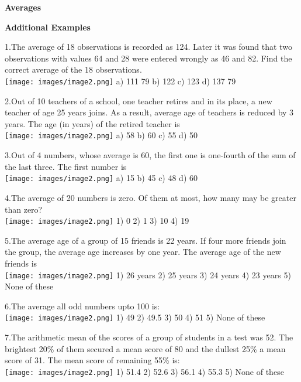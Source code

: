 \documentclass[
]{article}
\author{}
\date{}
\begin{document}
\begin{center}
	{\Large \textbf{Averages \\}}
\end{center}

{\large \textbf{Additional Examples \\}}

 1.The average of 18 observations is recorded as 124. Later it was found that two observations with values 64 and 28 were entered wrongly as 46 and 82. Find the correct average of the 18 observations.  \\
\texttt{[image: images/image2.png]}  a) 111 79 	b) 122 	c) 123 	d) 137 79

2.Out of 10 teachers of a school, one teacher retires and in its place, a new teacher of age 25 years joins. As a result, average age of teachers is reduced by 3 years. The age (in years) of the retired teacher is   \\
\texttt{[image: images/image2.png]}  a) 58 	b) 60 	c) 55 	d) 50

3.Out of 4 numbers, whose average is 60, the first one is one-fourth of the sum of the last three. The first number is   \\
\texttt{[image: images/image2.png]}  	a) 15 	b) 45 	c) 48 	d) 60

4.The average of 20 numbers is zero. Of them at most, how many may be greater than zero?   \\
\texttt{[image: images/image2.png]}  1) 0 	2) 1 	3) 10 	4) 19

5.The average age of a group of 15 friends is 22 years. If four more friends join the group, the average age increases by one year. The average age of the new friends is   \\
\texttt{[image: images/image2.png]}  	1) 26 years 	2) 25 years 	3) 24 years 4) 23 years 	5) None of these

6.The average all odd numbers upto 100 is:   \\
\texttt{[image: images/image2.png]}  1) 49 	2) 49.5 	3) 50 	4) 51 	5) None of these

7.The arithmetic mean of the scores of a group of students in a test was 52. The brightest 20\% of them secured a mean score of 80 and the dullest 25\% a mean score of 31. The mean score of remaining 55\% is:   \\
\texttt{[image: images/image2.png]}  1) 51.4 	2) 52.6 	3) 56.1 	4) 55.3 	5) None of these
\end{document}
